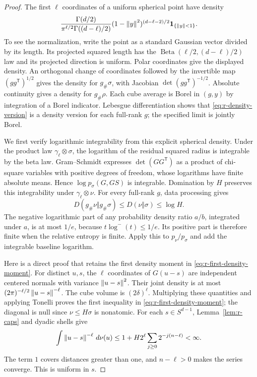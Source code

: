 \begin{proof}
The first \(\ell\) coordinates of a uniform spherical point have
density
\[
 \frac{\Gamma(d/2)}
      {\pi^{\ell/2}\Gamma((d-\ell)/2)}
 (1-\left\lVert y\right\rVert^2)^{(d-\ell-2)/2}
 \mathbf 1_{\{\left\lVert y\right\rVert<1\}}.
\]
To see the normalization, write the point as a standard Gaussian
vector divided by its length.  Its projected squared length has the
\(\operatorname{Beta}(\ell/2,(d-\ell)/2)\) law and its projected
direction is uniform.  Polar coordinates give the displayed
density.  An orthogonal change of coordinates followed by the
invertible map \((gg^{\mathsf T})^{1/2}\) gives the density for
\(g_\#\sigma\), with Jacobian
\(\det(gg^{\mathsf T})^{-1/2}\).  Absolute continuity gives a
density for \(g_\#\rho\).  Each cube average is Borel in \((g,y)\)
by integration of a Borel indicator.  Lebesgue differentiation
shows that \eqref{eq:r-density-version} is a density version for
each full-rank \(g\); the specified limit is jointly Borel.

We first verify logarithmic integrability from this explicit
spherical density.  Under the product law \(\gamma_\ell\otimes\sigma\),
the logarithm of the residual squared radius is integrable by the
beta law.  Gram--Schmidt expresses \(\det(GG^{\mathsf T})\) as a
product of chi-square variables with positive degrees of freedom,
whose logarithms have finite absolute means.  Hence
\(\log p_\sigma(G,GS)\) is integrable.  Domination by \(H\)
preserves this integrability under \(\gamma_\ell\otimes\nu\).
For every full-rank \(g\), data processing gives
\[
 D(g_\#\nu\Vert g_\#\sigma)\le D(\nu\Vert\sigma)\le\log H.
\]
The negative logarithmic part of any probability density ratio
\(a/b\), integrated under \(a\), is at most \(1/e\), because
\(t\log^-(t)\le1/e\).  Its positive part is therefore finite when
the relative entropy is finite.  Apply this to \(p_\nu/p_\sigma\)
and add the integrable baseline logarithm.

Here is a direct proof that retains the first density moment in
\eqref{eq:r-first-density-moment}.  For distinct \(u,s\), the
\(\ell\) coordinates of \(G(u-s)\) are independent centered
normals with variance \(\left\lVert u-s\right\rVert^2\).  Their joint density is
at most \((2\pi)^{-\ell/2}\left\lVert u-s\right\rVert^{-\ell}\).  The cube volume
is \((2\delta)^\ell\).  Multiplying these quantities and applying
Tonelli proves the first inequality in
\eqref{eq:r-first-density-moment}; the diagonal is null since
\(\nu\le H\sigma\) is nonatomic.  For each \(s\in S^{d-1}\),
Lemma~\ref{lem:r-caps} and dyadic shells give
\[
 \int\left\lVert u-s\right\rVert^{-\ell}\,d\nu(u)
 \le 1+H2^\ell\sum_{j\ge0}2^{-j(n-\ell)}<\infty.
\]
The term \(1\) covers distances greater than one, and \(n-\ell>0\)
makes the series converge.  This is uniform in \(s\).


\end{proof}
